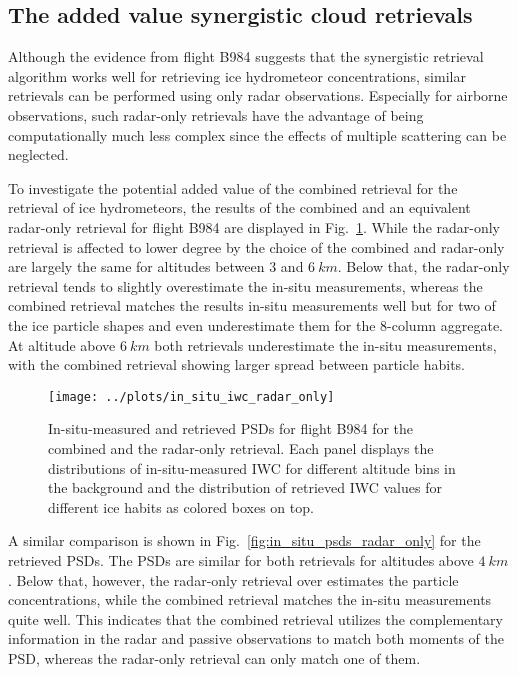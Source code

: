 \documentclass[journal abbreviation, manuscript]{copernicus}
\begin{document}
\subsection{The added value synergistic cloud retrievals}

Although the evidence from flight B984 suggests that the synergistic
retrieval algorithm works well for retrieving ice hydrometeor concentrations,
similar retrievals can be performed using only radar observations. Especially
for airborne observations, such radar-only retrievals have the advantage of
being computationally much less complex since the effects of multiple
scattering can be neglected.

To investigate the potential added value of the combined retrieval for the
retrieval of ice hydrometeors, the results of the combined and an equivalent
radar-only retrieval for flight B984 are displayed in
Fig.~\ref{fig:in_situ_iwc_radar_only}. While the radar-only retrieval is affected to
lower degree by the choice of the combined and radar-only are largely the same
for altitudes between $3$ and $6\ \unit{km}$. Below that, the radar-only
retrieval tends to slightly overestimate the in-situ measurements, whereas the
combined retrieval matches the results in-situ measurements well but for two of
the ice particle shapes and even underestimate them for the 8-column aggregate.
At altitude above $6\ \unit{km}$ both retrievals underestimate the in-situ
measurements, with the combined retrieval showing larger spread between
particle habits.

\begin{figure}[!hbpt]
  \centering
  \texttt{[image: ../plots/in\_situ\_iwc\_radar\_only]}
  \caption{In-situ-measured and retrieved PSDs for flight B984
    for the combined and the radar-only retrieval. Each panel displays
    the distributions of in-situ-measured IWC for different altitude
    bins in the background and the distribution of retrieved IWC values
    for different ice habits as colored boxes on top.}
  \label{fig:in_situ_iwc_radar_only}
\end{figure}

A similar comparison is shown in Fig.~\ref{fig:in_situ_psds_radar_only} for the
retrieved PSDs. The PSDs are similar for both retrievals for altitudes above
$4\ \unit{km}$. Below that, however, the radar-only retrieval over estimates the
particle concentrations, while the combined retrieval matches the in-situ
measurements quite well. This indicates that the combined retrieval utilizes the
complementary information in the radar and passive observations to match both
moments of the PSD, whereas the radar-only retrieval can
only match one of them.
\end{document}
